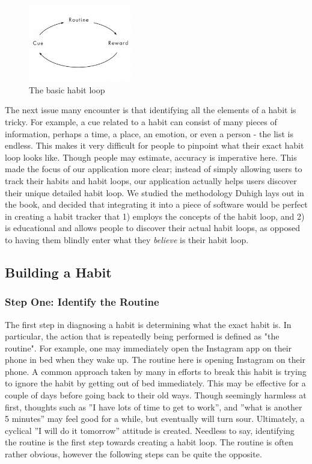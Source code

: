 \begin{figure}[h]
\centering
\includegraphics[width=0.4\textwidth]{images/habitloopbasic.jpg}
\caption{The basic habit loop}
\end{figure}
\newline The next issue many encounter is that identifying all the elements of a habit is tricky. For example, a cue related to a habit can consist of many pieces of information, perhaps a time, a place, an emotion, or even a person - the list is endless. This makes it very difficult for people to pinpoint what their exact habit loop looks like. Though people may estimate, accuracy is imperative here. This made the focus of our application more clear; instead of simply allowing users to track their habits and habit loops, our application actually helps users discover their unique detailed habit loop.
\newline \newline
We studied the methodology Duhigh lays out in the book, and decided that integrating it into a piece of software would be perfect in creating a habit tracker that 1) employs the concepts of the habit loop, and 2) is educational and allows people to discover their actual habit loops, as opposed to having them blindly enter what they \textit{believe} is their habit loop.

\subsection{Building a Habit}
\subsubsection*{Step One: Identify the Routine}
The first step in diagnosing a habit is determining what the exact habit is. In particular, the action that is repeatedly being performed is defined as "the routine". For example, one may immediately open the Instagram app on their phone in bed when they wake up. The routine here is opening Instagram on their phone. A common approach taken by many in efforts to break this habit is trying to ignore the habit by getting out of bed immediately. This may be effective for a couple of days before going back to their old ways. Though seemingly harmless at first, thoughts such as ”I have lots of time to get to work”, and ”what is another 5 minutes” may feel good for a while, but eventually will turn sour. Ultimately, a cyclical ”I will do it tomorrow” attitude is created.
\newline \newline
Needless to say, identifying the routine is the first step towards creating a habit loop. The routine is often rather obvious, however the following steps can be quite the opposite.
